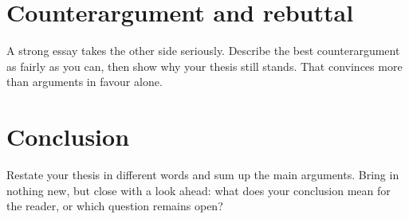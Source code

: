 \documentclass[11pt, a4paper]{article}
\begin{document}
\section{Counterargument and rebuttal}
A strong essay takes the other side seriously. Describe the best
counterargument as fairly as you can, then show why your thesis still
stands. That convinces more than arguments in favour alone.

\section{Conclusion}
Restate your thesis in different words and sum up the main arguments.
Bring in nothing new, but close with a look ahead: what does your
conclusion mean for the reader, or which question remains open?

\printbibliography[title={References}]
\end{document}
